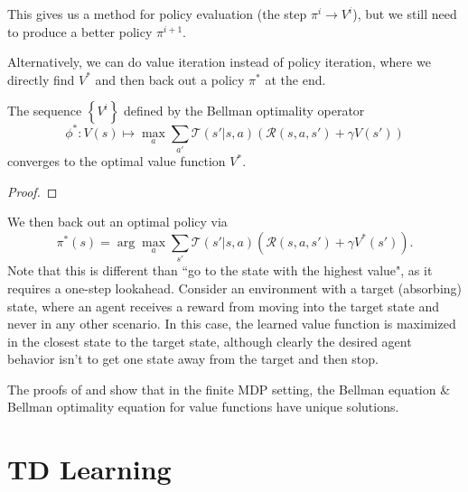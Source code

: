 \documentclass[twoside,10pt]{report}
\begin{document}
This gives us a method for policy evaluation (the step $\pi^{i} \to V^{i}$), but we still need to produce a better policy $\pi^{i+1}$.


Alternatively, we can do value iteration instead of policy iteration, where we directly find $V^{*}$ and then back out a policy $\pi^{*}$ at the end.

\begin{prop}
The sequence $\left\{ V^{i} \right\}$ defined by the Bellman optimality operator
\[
\phi^{*} : V(s) \mapsto \max_{a} \sum_{a'}\mathcal{T}(s'|s,a) \left( \mathcal{R}(s,a,s') + \gamma V(s') \right)
\] converges to the optimal value function $V^{*}$.
\label{bellmanoptimalityoperator}
\end{prop}
\begin{proof}
\end{proof}

We then back out an optimal policy via
\[
	\pi^{*}(s) = \arg \max_{a} \sum_{s'} \mathcal{T}(s'|s,a) \left( \mathcal{R}(s,a,s') + \gamma V^{*}(s') \right).
\]
Note that this is different than ``go to the state with the highest value", as it requires a one-step lookahead. Consider an environment with a target (absorbing) state, where an agent receives a reward from moving into the target state and never in any other scenario. In this case, the learned value function is maximized in the closest state to the target state, although clearly the desired agent behavior isn't to get one state away from the target and then stop.


\begin{note}[]
	The proofs of  and  show that in the finite MDP setting, the Bellman equation \& Bellman optimality equation for value functions have unique solutions.
\end{note}

\section{TD Learning}

\end{document}
